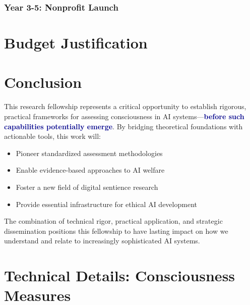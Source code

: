 \documentclass[11pt,a4paper]{article}
\newcommand{\impact}[1]{\textbf{\textcolor{darkblue}{#1}}}
\begin{document}
\subsubsection{Year 3-5: Nonprofit Launch}

\section{Budget Justification}
\label{sec:budget}

\section{Conclusion}
\label{sec:conclusion}

This research fellowship represents a critical opportunity to establish rigorous, practical frameworks for assessing consciousness in AI systems—\impact{before such capabilities potentially emerge}. By bridging theoretical foundations with actionable tools, this work will:

\begin{itemize}
    \item Pioneer standardized assessment methodologies
    \item Enable evidence-based approaches to AI welfare
    \item Foster a new field of digital sentience research
    \item Provide essential infrastructure for ethical AI development
\end{itemize}

The combination of technical rigor, practical application, and strategic dissemination positions this fellowship to have lasting impact on how we understand and relate to increasingly sophisticated AI systems.




\appendix

\section{Technical Details: Consciousness Measures}
\end{document}
